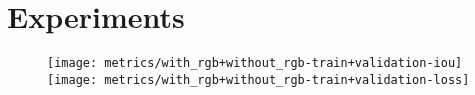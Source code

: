 \section{Experiments}%
\label{sec:experiments}

\begin{figure}[htb]
  \centering
  \texttt{[image: metrics/with\_rgb+without\_rgb-train+validation-iou]}
  \texttt{[image: metrics/with\_rgb+without\_rgb-train+validation-loss]}
\end{figure}

